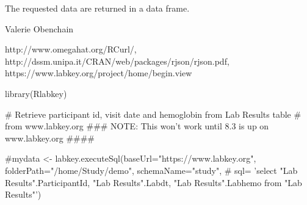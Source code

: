 \begin{Value}
The requested data are returned in a data frame.
\end{Value}
\begin{Author}\relax
Valerie Obenchain
\end{Author}
\begin{References}\relax
http://www.omegahat.org/RCurl/, 
http://dssm.unipa.it/CRAN/web/packages/rjson/rjson.pdf,
https://www.labkey.org/project/home/begin.view
\end{References}
\begin{SeeAlso}\relax
{}
\end{SeeAlso}
\begin{Examples}
\begin{ExampleCode}

library(Rlabkey)

# Retrieve participant id, visit date and hemoglobin from Lab Results table
# from www.labkey.org
### NOTE: This won't work until 8.3 is up on www.labkey.org ####

#mydata <- labkey.executeSql(baseUrl="https://www.labkey.org", folderPath="/home/Study/demo", schemaName="study", 
#                               sql= 'select "Lab Results".ParticipantId, "Lab Results".Labdt, "Lab Results".Labhemo from "Lab Results"')

\end{ExampleCode}
\end{Examples}

